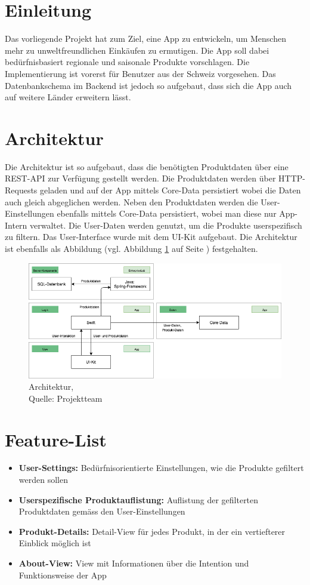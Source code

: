 \documentclass[12pt,titlepage]{article}
\begin{document}
\newpage


\section{Einleitung}
Das vorliegende Projekt hat zum Ziel, eine App zu entwickeln, um Menschen mehr zu unweltfreundlichen Einkäufen zu ermutigen. Die App soll dabei bedürfnisbasiert regionale und saisonale Produkte vorschlagen. Die Implementierung ist vorerst für Benutzer aus der Schweiz vorgesehen. Das Datenbankschema im Backend ist jedoch so aufgebaut, dass sich die App auch auf weitere Länder erweitern lässt.

\section{Architektur}
Die Architektur ist so aufgebaut, dass die benötigten Produktdaten über eine REST-API zur Verfügung gestellt werden. Die Produktdaten werden über HTTP-Requests geladen und auf der App mittels Core-Data persistiert wobei die Daten auch gleich abgeglichen werden. Neben den Produktdaten werden die User-Einstellungen ebenfalls mittels Core-Data persistiert, wobei man diese nur App-Intern verwaltet. Die User-Daten werden genutzt, um die Produkte userspezifisch zu filtern. Das User-Interface wurde mit dem UI-Kit aufgebaut. Die Architektur ist ebenfalls als Abbildung (vgl. Abbildung \ref{img: Architektur} auf Seite \pageref{img: Architektur}) festgehalten.
\begin{figure}[H]
	\centering
	\includegraphics[width=15cm]{Img/Architektur2.png}
	\caption[Architektur]{Architektur,\\ Quelle: Projektteam}
	\label{img: Architektur}
\end{figure}

\section{Feature-List}
\begin{itemize}
	\item \textbf{User-Settings:} Bedürfnisorientierte Einstellungen, wie die Produkte gefiltert werden sollen
	\item \textbf{Userspezifische Produktauflistung:} Auflistung der gefilterten Produktdaten gemäss den User-Einstellungen
	\item \textbf{Produkt-Details:} Detail-View für jedes Produkt, in der ein vertiefterer Einblick möglich ist
	\item \textbf{About-View:} View mit Informationen über die Intention und Funktionsweise der App
\end{itemize}
\end{document}
